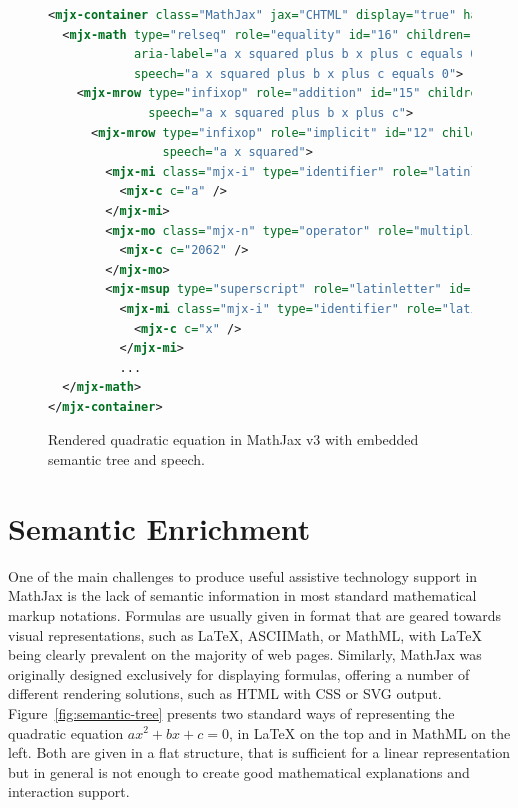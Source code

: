 \documentclass{sig-alternate}
\begin{document}
\begin{figure}[ht!]
  \begin{lstlisting}[language=XML,basicstyle=\scriptsize\tt]
<mjx-container class="MathJax" jax="CHTML" display="true" hasspeech="true" tabindex="1">
  <mjx-math type="relseq" role="equality" id="16" children="15,10" content="9"
            aria-label="a x squared plus b x plus c equals 0" 
            speech="a x squared plus b x plus c equals 0">
    <mjx-mrow type="infixop" role="addition" id="15" children="12,14,8" content="4,7" parent="16"
              speech="a x squared plus b x plus c">
      <mjx-mrow type="infixop" role="implicit" id="12" children="0,3" content="11" parent="15"
                speech="a x squared">
        <mjx-mi class="mjx-i" type="identifier" role="latinletter" font="italic" id="0" parent="12" speech="a">
          <mjx-c c="a" />
        </mjx-mi>
        <mjx-mo class="mjx-n" type="operator" role="multiplication" id="11" parent="12" speech="times">
          <mjx-c c="2062" />
        </mjx-mo>
        <mjx-msup type="superscript" role="latinletter" id="3" children="1,2" parent="12" speech="x squared">
          <mjx-mi class="mjx-i" type="identifier" role="latinletter" font="italic" id="1" parent="3" speech="x">
            <mjx-c c="x" />
          </mjx-mi>
          ...
  </mjx-math>
</mjx-container>
\end{lstlisting}
\caption{Rendered quadratic equation in MathJax v3 with embedded
  semantic tree and speech.}
\label{fig:rendered}
\end{figure}



\section{Semantic Enrichment}
\label{sec:semantic-enrichment}

One of the main challenges to produce useful assistive technology support in
MathJax is the lack of semantic information in most standard mathematical markup
notations. Formulas are usually given in format that are geared towards visual
representations, such as {\LaTeX}, ASCIIMath, or MathML, with {\LaTeX} being
clearly prevalent on the majority of web pages. Similarly, MathJax was originally
designed exclusively for displaying formulas, offering a number of different
rendering solutions, such as HTML with CSS or SVG output.
Figure~\ref{fig:semantic-tree} presents two standard ways of representing the
quadratic equation $ax^2 + bx + c = 0$, in {\LaTeX} on the top and in MathML on
the left. Both are given in a flat structure, that is sufficient for a linear
representation but in general is not enough to create good mathematical
explanations and interaction support.
\end{document}
